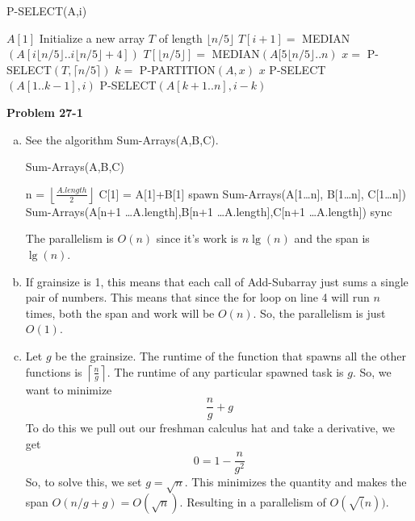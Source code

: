 \documentclass{article}
\begin{document}

\begin{algorithm}
\caption{P-SELECT(A,i)}
\begin{algorithmic}[1]
	\State \Return $A[1]$
\EndIf
\State Initialize a new array $T$ of length $\lfloor n/5 \rfloor$
	\State $T[i+1] = $ MEDIAN$(A[i\lfloor n/5 \rfloor..i\lfloor n/5 \rfloor + 4])$
\EndParFor
{}
	\State $T[\lfloor n/5 \rfloor] =$  MEDIAN$(A[5\lfloor n/5 \rfloor..n)$
\EndIf
\State $x = $ P-SELECT$(T, \lceil n/5 \rceil)$
\State $k = $ P-PARTITION$(A,x)$
	\State \Return $x$
	\State P-SELECT$(A[1..k-1],i)$
\Else
	\State P-SELECT$(A[k+1..n],i-k)$
\EndIf
\end{algorithmic}
\end{algorithm}

\noindent\textbf{Problem 27-1}\\

\begin{enumerate}[a.]
\item
See the algorithm Sum-Arrays(A,B,C).
\begin{algorithm}
\caption{Sum-Arrays(A,B,C)}
\begin{algorithmic}
\State n = $\left\lfloor \frac{A.length}{2} \right\rfloor$
\State C[1] = A[1]+B[1]
\Else
\State spawn Sum-Arrays(A[1\ldots n], B[1\ldots n], C[1\ldots n])
\State Sum-Arrays(A[n+1 \ldots A.length],B[n+1 \ldots A.length],C[n+1 \ldots A.length])
\State sync
\EndIf
\end{algorithmic}
\end{algorithm}
The parallelism is $O(n)$ since it's work is $n\lg(n)$ and the span is $\lg(n)$. 
\item
If grainsize is 1, this means that each call of Add-Subarray just sums a single pair of numbers. This means that since the for loop on line 4 will run $n$ times, both the span and work will be $O(n)$. So, the parallelism is just $O(1)$.
\item
Let $g$ be the grainsize. The runtime of the function that spawns all the other functions is $\left\lceil \frac{n}{g} \right\rceil$. The runtime of any particular spawned task is $g$. So, we want to minimize 
\[
\frac{n}{g}+g
\]
To do this we pull out our freshman calculus hat and take a derivative, we get
\[
0 = 1 - \frac{n}{g^2}
\]
So, to solve this, we set $g = \sqrt{n}$. This minimizes the quantity and makes the span $O(n/g +g) = O(\sqrt{n})$. Resulting in a parallelism of $O(\sqrt(n))$.
\end{enumerate}
\end{document}
